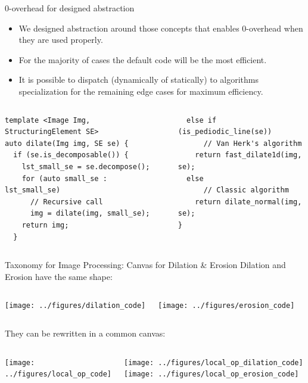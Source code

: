 \documentclass[12pt,aspectratio=169]{beamer}
\begin{document}
\begin{frame}[fragile]{0-overhead for designed abstraction}
  \begin{itemize}
    \item We designed abstraction around those concepts that enables 0-overhead when they are used properly.
    \item For the majority of cases the default code will be the most efficient.
    \item It is possible to dispatch (dynamically of statically) to algorithms specialization for the remaining edge
          cases for maximum efficiency.
  \end{itemize}
  \begin{columns}[T,onlytextwidth]
    \begin{verbatim}
template <Image Img, StructuringElement SE>
auto dilate(Img img, SE se) {
  if (se.is_decomposable()) {
    lst_small_se = se.decompose();
    for (auto small_se : lst_small_se)
      // Recursive call
      img = dilate(img, small_se);
    return img;
  }
    \end{verbatim}

    \begin{verbatim}
  else if (is_pediodic_line(se))
      // Van Herk's algorithm
    return fast_dilate1d(img, se);
  else
      // Classic algorithm
    return dilate_normal(img, se);
}
    \end{verbatim}

  \end{columns}
\end{frame}

\begin{frame}[fragile]{Taxonomy for Image Processing: Canvas for Dilation \& Erosion}
  Dilation and Erosion have the same shape:
  \begin{columns}[T,onlytextwidth]
    \texttt{[image: ../figures/dilation\_code]}

    \texttt{[image: ../figures/erosion\_code]}
  \end{columns}
  \bigskip
  They can be rewritten in a common canvas:
  \begin{columns}[T,onlytextwidth]
    \texttt{[image: ../figures/local\_op\_code]}

    \texttt{[image: ../figures/local\_op\_dilation\_code]}
    \texttt{[image: ../figures/local\_op\_erosion\_code]}
  \end{columns}
\end{frame}
\end{document}
